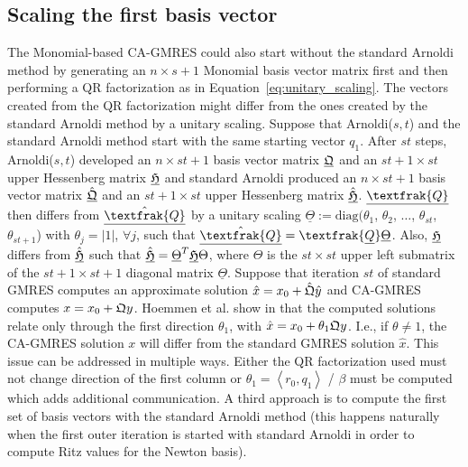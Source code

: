 \documentclass{scrartcl}
\numberwithin{equation}{section}
\begin{document}
\subsection{Scaling the first basis vector} \label{sec:scaling_first_basis_vec}
The Monomial-based CA-GMRES could also start without the standard Arnoldi method by generating an $n \times s + 1$ Monomial basis vector matrix first and then performing a QR factorization as in Equation~\eqref{eq:unitary_scaling}. The vectors created from the QR factorization might differ from the ones created by the standard Arnoldi method by a unitary scaling. Suppose that Arnoldi($s,t$) and the standard Arnoldi method start with the same starting vector $q_1$. After $st$ steps, Arnoldi($s,t$) developed an $n \times st + 1$ basis vector matrix $\underline{\frak{Q}}$ and an $st + 1 \times st$ upper Hessenberg matrix $\underline{\frak{H}}$ and standard Arnoldi produced an $n \times st + 1$ basis vector matrix $\underline{\hat{\frak{Q}}}$ and an $st + 1 \times st$ upper Hessenberg matrix $\underline{\hat{\frak{H}}}$. $\underline{\textfrak{Q}}$ then differs from $\underline{\hat{\textfrak{Q}}}$ by a unitary scaling $\underline{\Theta} := \text{diag}(\theta_1$, $\theta_2$, $\ldots$, $\theta_{st}$, $\theta_{st+1}$) with $\theta_j = |1|$,  $\forall j$, such that $\underline{\hat{\textfrak{Q}}} = \textfrak{\underline{Q}}\underline{\Theta}$. Also, $\underline{\frak{H}}$ differs from $\underline{\hat{\frak{H}}}$ such that $\hat{\underline{\frak{H}}} = \underline{\Theta}^T \underline{\frak{H}} \Theta$, where $\Theta$ is the $st \times st$ upper left submatrix of the $st + 1 \times st + 1$ diagonal matrix $\underline{\Theta}$. Suppose that iteration $st$ of standard GMRES computes an approximate solution $\textcolor{darkcyan}{\hat{x}} = x_0 + \color{darkcyan}\hat{\frak{Q}} \hat{y}$ and CA-GMRES computes $\textcolor{magenta}x = x_0 + \color{magenta}\frak{Q} y$. Hoemmen et al. show in \cite{Hoemmen:2010:CKS:1970638} that the computed solutions relate only through the first direction $\theta_1$, with $\textcolor{darkcyan}{\hat{x}} = x_0 + \theta_1 \color{magenta}\frak{Q}y$. I.e., if $\theta \ne 1$, the CA-GMRES solution $x$ will differ from the standard GMRES solution $\hat{x}$.
This issue can be addressed in multiple ways. Either the QR factorization used must not change direction of the first column or $\theta_1 = \left< r_0, q_1 \right>$ / $\beta$ must be computed which adds additional communication. A third approach is to compute the first set of basis vectors with the standard Arnoldi method (this happens naturally when the first outer iteration is started with standard Arnoldi in order to compute Ritz values for the Newton basis).
\end{document}
